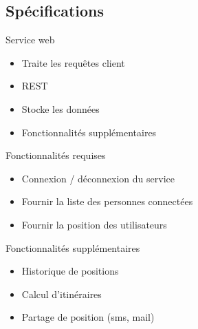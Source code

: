 \documentclass{beamer} %
\begin{document}
  \subsection{Spécifications}
  \begin{frame}{\subsecname}
    \begin{block}{Service web}
      \begin{itemize}
        \item Traite les requêtes client
        \item REST
        \item Stocke les données
        \item Fonctionnalités supplémentaires
      \end{itemize}
    \end{block}

    \begin{alertblock}{Fonctionnalités requises}
      \begin{itemize}
        \item Connexion / déconnexion du service
        \item Fournir la liste des personnes connectées
        \item Fournir la position des utilisateurs
      \end{itemize}
    \end{alertblock}

    \begin{exampleblock}{Fonctionnalités supplémentaires}
      \begin{itemize}
        \item Historique de positions
        \item Calcul d'itinéraires
        \item Partage de position (sms, mail)
      \end{itemize}
    \end{exampleblock}

  \end{frame}
\end{document}
